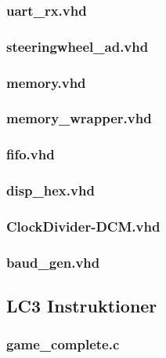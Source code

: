 \subsubsection*{uart\_rx.vhd}


\subsubsection*{steeringwheel\_ad.vhd}


\subsubsection*{memory.vhd}


\subsubsection*{memory\_wrapper.vhd}


\subsubsection*{fifo.vhd}


\subsubsection*{disp\_hex.vhd}


\subsubsection*{ClockDivider-DCM.vhd}


\subsubsection*{baud\_gen.vhd}


\subsection*{LC3 Instruktioner}
\subsubsection*{game\_complete.c}


